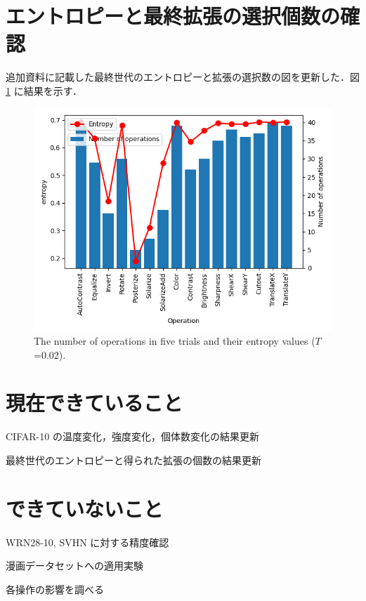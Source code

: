\documentclass[onecolumn]{ujarticle}   %
\begin{document}
  \section{エントロピーと最終拡張の選択個数の確認}
  追加資料に記載した最終世代のエントロピーと拡張の選択数の図を更新した．図 \ref{fig:num_operations_t002} に結果を示す．

  \begin{figure}[t]
    \centering
    \includegraphics[width=0.8\columnwidth]{figure/num_operations_t002.png}
    \caption{The number of operations in five trials and their entropy values ($T$=0.02).}
    \label{fig:num_operations_t002}
  \end{figure}

  \section{現在できていること}
  \begin{itemize}{
    \item{CIFAR-10 の温度変化，強度変化，個体数変化の結果更新}
    \item{最終世代のエントロピーと得られた拡張の個数の結果更新}
	}\end{itemize}

  \section{できていないこと}
  \begin{itemize}{
    \item{WRN28-10, SVHN に対する精度確認}
    \item{漫画データセットへの適用実験}
    \item{各操作の影響を調べる}
	}\end{itemize}

\end{document}
